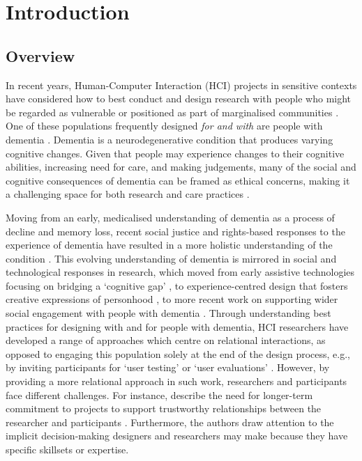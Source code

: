 \chapter{Introduction}

\section{Overview}
\label{Intro: Overiew}

In recent years, Human-Computer Interaction (HCI) projects in sensitive contexts have considered how to best conduct and design research with people who might be regarded as vulnerable or positioned as part of marginalised communities \citep{waycott_challenge_2015}. One of these populations frequently designed \textit{for and with} are people with dementia \citep{suijkerbuijk_active_2019}. Dementia is a neurodegenerative condition that produces varying cognitive changes. Given that people may experience changes to their cognitive abilities, increasing need for care, and making judgements, many of the social and cognitive consequences of dementia can be framed as ethical concerns, making it a challenging space for both research and care practices \citep{herrmann_systematic_2018}.

Moving from an early, medicalised understanding of dementia as a process of decline and memory loss, recent social justice and rights-based responses to the experience of dementia have resulted in a more holistic understanding of the condition \citep{shakespeare_rights_2019}. This evolving understanding of dementia is mirrored in social and technological responses in research, which moved from early assistive technologies focusing on bridging a ‘cognitive gap’ \citep{mulvenna_supporting_2010}, to experience-centred design that fosters creative expressions of personhood \citep{morrissey_value_2017}, to more recent work on supporting wider social engagement with people with dementia \citep{foley_care_2019, lazar_safe_2019, welsh_ticket_2018}. Through understanding best practices for designing with and for people with dementia, HCI researchers have developed a range of approaches which centre on relational interactions, as opposed to engaging this population solely at the end of the design process, e.g., by inviting participants for ‘user testing’ or ‘user evaluations’ \citep{brankaert_intersections_2019,schorch_designing_2016, vines_designing_2013}. However, by providing a more relational approach in such work, researchers and participants face different challenges. For instance, \cite{hendriks_challenges_2014} describe the need for longer-term commitment to projects to support trustworthy relationships between the researcher and participants . Furthermore, the authors draw attention to the implicit decision-making designers and researchers may make because they have specific skillsets or expertise.

